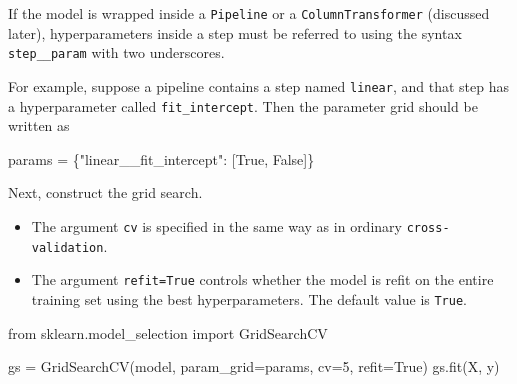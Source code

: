 \documentclass[
  letterpaper,
  DIV=11,
  numbers=noendperiod]{scrreprt}
\newenvironment{Shaded}{\begin{snugshade}}{\end{snugshade}}
\newcommand{\DecValTok}[1]{\textcolor[rgb]{0.68,0.00,0.00}{#1}}
\newcommand{\ImportTok}[1]{\textcolor[rgb]{0.00,0.46,0.62}{#1}}
\newcommand{\NormalTok}[1]{\textcolor[rgb]{0.00,0.23,0.31}{#1}}
\newcommand{\OperatorTok}[1]{\textcolor[rgb]{0.37,0.37,0.37}{#1}}
\newcommand{\StringTok}[1]{\textcolor[rgb]{0.13,0.47,0.30}{#1}}
\newcommand{\VariableTok}[1]{\textcolor[rgb]{0.07,0.07,0.07}{#1}}
\providecommand{\tightlist}{%
  \setlength{\itemsep}{0pt}\setlength{\parskip}{0pt}}
\theoremstyle{definition}
\theoremstyle{definition}
\theoremstyle{plain}
\theoremstyle{plain}
\theoremstyle{remark}
\begin{document}
\begin{tcolorbox}[enhanced jigsaw, arc=.35mm, bottomrule=.15mm, bottomtitle=1mm, breakable, colback=white, colbacktitle=quarto-callout-important-color!10!white, colframe=quarto-callout-important-color-frame, coltitle=black, left=2mm, leftrule=.75mm, opacityback=0, opacitybacktitle=0.6, rightrule=.15mm, title=\textcolor{quarto-callout-important-color}{\faExclamation}\hspace{0.5em}{\texttt{Pipeline} and \texttt{ColumnTransformer}}, titlerule=0mm, toprule=.15mm, toptitle=1mm]

If the model is wrapped inside a \texttt{Pipeline} or a
\texttt{ColumnTransformer} (discussed later), hyperparameters inside a
step must be referred to using the syntax \texttt{step\_\_param} with
two underscores.

For example, suppose a pipeline contains a step named \texttt{linear},
and that step has a hyperparameter called \texttt{fit\_intercept}. Then
the parameter grid should be written as

\begin{Shaded}
\begin{Highlighting}[]
\NormalTok{params }\OperatorTok{=}\NormalTok{ \{}\StringTok{"linear\_\_fit\_intercept"}\NormalTok{: [}\VariableTok{True}\NormalTok{, }\VariableTok{False}\NormalTok{]\}}
\end{Highlighting}
\end{Shaded}

\end{tcolorbox}

Next, construct the grid search.

\begin{itemize}
\tightlist
\item
  The argument \texttt{cv} is specified in the same way as in ordinary
  \texttt{cross-validation}.
\item
  The argument \texttt{refit=True} controls whether the model is refit
  on the entire training set using the best hyperparameters. The default
  value is \texttt{True}.
\end{itemize}

\begin{Shaded}
\begin{Highlighting}[]
\ImportTok{from}\NormalTok{ sklearn.model\_selection }\ImportTok{import}\NormalTok{ GridSearchCV}

\NormalTok{gs }\OperatorTok{=}\NormalTok{ GridSearchCV(model, param\_grid}\OperatorTok{=}\NormalTok{params, cv}\OperatorTok{=}\DecValTok{5}\NormalTok{, refit}\OperatorTok{=}\VariableTok{True}\NormalTok{)}
\NormalTok{gs.fit(X, y)}
\end{Highlighting}
\end{Shaded}
\end{document}
